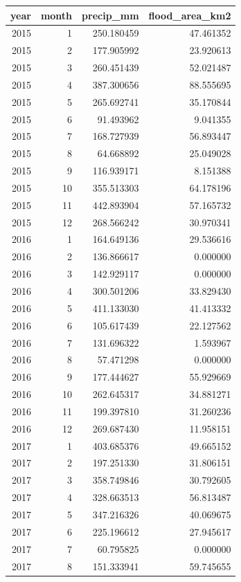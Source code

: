 \begin{tabular}{rrrr}
\toprule
year & month & precip\_mm & flood\_area\_km2 \\
\midrule
2015 & 1 & 250.180459 & 47.461352 \\
2015 & 2 & 177.905992 & 23.920613 \\
2015 & 3 & 260.451439 & 52.021487 \\
2015 & 4 & 387.300656 & 88.555695 \\
2015 & 5 & 265.692741 & 35.170844 \\
2015 & 6 & 91.493962 & 9.041355 \\
2015 & 7 & 168.727939 & 56.893447 \\
2015 & 8 & 64.668892 & 25.049028 \\
2015 & 9 & 116.939171 & 8.151388 \\
2015 & 10 & 355.513303 & 64.178196 \\
2015 & 11 & 442.893904 & 57.165732 \\
2015 & 12 & 268.566242 & 30.970341 \\
2016 & 1 & 164.649136 & 29.536616 \\
2016 & 2 & 136.866617 & 0.000000 \\
2016 & 3 & 142.929117 & 0.000000 \\
2016 & 4 & 300.501206 & 33.829430 \\
2016 & 5 & 411.133030 & 41.413332 \\
2016 & 6 & 105.617439 & 22.127562 \\
2016 & 7 & 131.696322 & 1.593967 \\
2016 & 8 & 57.471298 & 0.000000 \\
2016 & 9 & 177.444627 & 55.929669 \\
2016 & 10 & 262.645317 & 34.881271 \\
2016 & 11 & 199.397810 & 31.260236 \\
2016 & 12 & 269.687430 & 11.958151 \\
2017 & 1 & 403.685376 & 49.665152 \\
2017 & 2 & 197.251330 & 31.806151 \\
2017 & 3 & 358.749846 & 30.792605 \\
2017 & 4 & 328.663513 & 56.813487 \\
2017 & 5 & 347.216326 & 40.069675 \\
2017 & 6 & 225.196612 & 27.945617 \\
2017 & 7 & 60.795825 & 0.000000 \\
2017 & 8 & 151.333941 & 59.745655 \\

\end{tabular}
